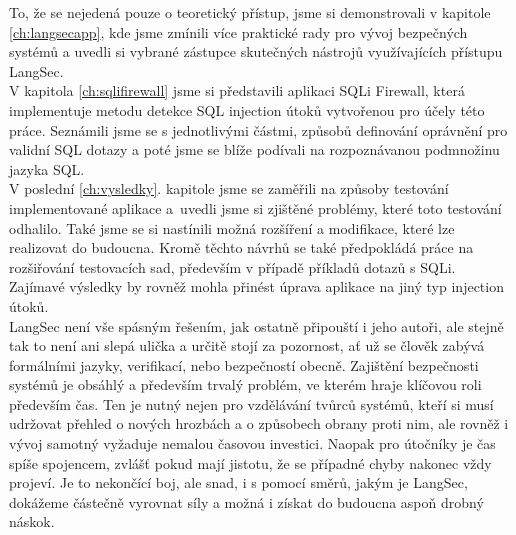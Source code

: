 To, že se nejedená pouze o teoretický přístup, jsme si demonstrovali v kapitole \ref{ch:langsecapp}, kde jsme zmínili více praktické rady pro vývoj
bezpečných systémů a uvedli si vybrané zástupce skutečných nástrojů využívajících přístupu LangSec. \\

V kapitola \ref{ch:sqlifirewall} jsme si představili aplikaci SQLi Firewall, která implementuje metodu detekce SQL injection útoků vytvořenou pro
účely této práce. Seznámili jsme se s jednotlivými částmi, způsobů definování oprávnění pro validní SQL dotazy a poté jsme se blíže podívali
na rozpoznávanou podmnožinu jazyka SQL. \\

V poslední \ref{ch:vysledky}. kapitole jsme se zaměřili na způsoby testování implementované aplikace a~uvedli jsme si zjištěné problémy, které toto testování odhalilo.
Také jsme se si nastínili možná rozšíření a modifikace, které lze realizovat do budoucna. Kromě těchto návrhů se také předpokládá práce na rozšiřování testovacích sad,
především v případě příkladů dotazů s SQLi. Zajímavé výsledky by rovněž mohla přinést úprava aplikace na jiný typ injection útoků. \\

LangSec není vše spásným řešením, jak ostatně připouští i jeho autoři, ale stejně tak to není ani slepá ulička a určitě stojí za pozornost, ať už se 
člověk zabývá formálními jazyky, verifikací, nebo bezpečností obecně. Zajištění bezpečnosti systémů je obsáhlý a především trvalý problém,
ve kterém hraje klíčovou roli především čas. Ten je nutný nejen pro vzdělávání tvůrců systémů, kteří si musí udržovat přehled o nových hrozbách a o způsobech obrany proti nim,
ale rovněž i vývoj samotný vyžaduje nemalou časovou investici. Naopak pro útočníky je čas spíše spojencem, zvlášť pokud mají jistotu, že se případné chyby nakonec vždy projeví.
Je to nekončící boj, ale snad, i s pomocí směrů, jakým je LangSec, dokážeme částečně vyrovnat síly a možná i získat do budoucna aspoň drobný náskok.


